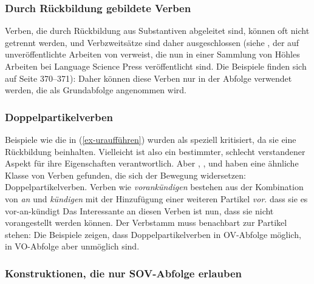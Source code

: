 \subsubsection{Durch Rückbildung gebildete Verben}

Verben, die durch Rückbildung aus Substantiven abgeleitet sind, können oft nicht getrennt werden, und Verbzweitsätze sind daher ausgeschlossen (siehe \citealt[]{Haider93a}, der auf unveröffentlichte Arbeiten
von \citealt{Hoehle91b} verweist, die nun in einer Sammlung von Höhles Arbeiten bei Language Science Press veröffentlicht sind. Die
Beispiele finden sich auf Seite 370--371):
\eal
\label{ex-uraufführen}
\zl
Daher können diese Verben nur in der Abfolge verwendet werden, die als Grundabfolge angenommen wird.%

\subsubsection{Doppelpartikelverben}

Beispiele wie die in (\ref{ex-uraufführen}) wurden als speziell kritisiert, da sie eine
Rückbildung beinhalten. Vielleicht ist also ein bestimmter, schlecht verstandener Aspekt für ihre Eigenschaften verantwortlich. Aber
\citet[]{Haider93a},
\citet[]{Vikner2001a}, \citet{Fortmann2007a} und \citet[--60]{Haider2010a} haben eine ähnliche
Klasse von Verben gefunden, die sich der Bewegung widersetzen: Doppelpartikelverben. Verben wie \emph{vorankündigen}
bestehen aus der Kombination von \emph{an} und \emph{kündigen} mit der Hinzufügung einer weiteren Partikel \emph{vor}.
\ea 
\label{ex-dass-sie-es-vorankündigt}
dass sie es vor-an-kündigt
\z
Das Interessante an diesen Verben ist nun, dass sie nicht vorangestellt werden können. Der Verbstamm muss
benachbart zur Partikel stehen:
\eal
{}
\zl
Die Beispiele zeigen, dass Doppelpartikelverben in OV-Abfolge möglich, in VO-Abfolge aber unmöglich sind.

\subsubsection{Konstruktionen, die nur SOV-Abfolge erlauben}

